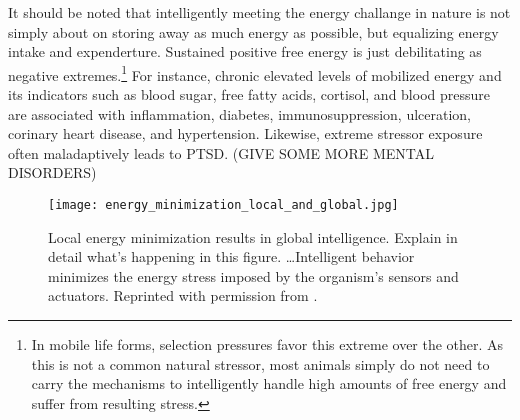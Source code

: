 It should be noted that intelligently meeting the energy challange in nature is not simply about on storing away as much energy as possible, but equalizing energy intake and expenderture. Sustained positive free energy is just debilitating as negative extremes.\footnote{In mobile life forms, selection pressures favor this extreme over the other. As this is not a common natural stressor, most animals simply do not need to carry the mechanisms to intelligently handle high amounts of free energy and suffer from resulting stress. } For instance, chronic elevated levels of mobilized energy and its indicators such as blood sugar, free fatty acids, cortisol, and blood pressure are associated with inflammation, diabetes, immunosuppression, ulceration, corinary heart disease, and hypertension. Likewise, extreme stressor exposure often maladaptively leads to PTSD. (GIVE SOME MORE MENTAL DISORDERS)

\begin{wrapfigure}{r}{0.5\textwidth}
 \centering
 \texttt{[image: energy\_minimization\_local\_and\_global.jpg]}
 \label{fig:1}
 \caption{Local energy minimization results in global intelligence. Explain in detail what's happening in this figure. \dots Intelligent behavior minimizes the energy stress imposed by the organism's sensors and actuators. Reprinted with permission from \cite{Vergara2019}.}
\end{wrapfigure}

